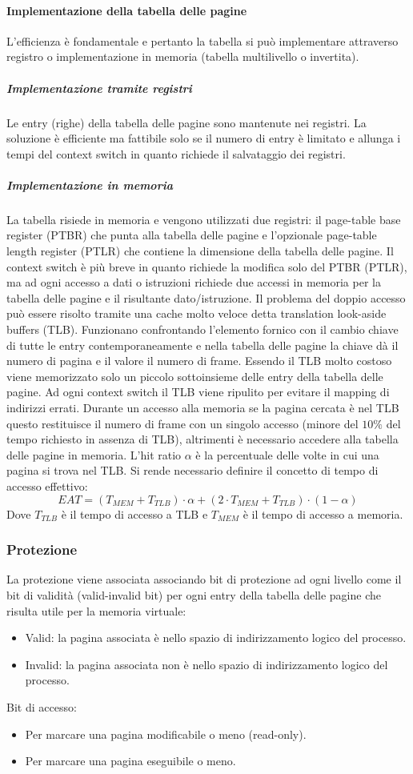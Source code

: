 \paragraph{Implementazione della tabella delle pagine}
L'efficienza \`e fondamentale e pertanto la tabella si pu\`o implementare attraverso registro o implementazione in memoria (tabella multilivello o invertita).
\subparagraph{Implementazione tramite registri}
Le entry (righe) della tabella delle pagine sono mantenute nei registri. La soluzione \`e efficiente ma fattibile solo se il numero di entry \`e limitato e allunga i tempi del context
switch in quanto richiede il salvataggio dei registri. 
\subparagraph{Implementazione in memoria}
La tabella risiede in memoria e vengono utilizzati due registri: il page-table base register (PTBR) che punta alla tabella delle pagine e l'opzionale page-table length register (PTLR) 
che contiene la dimensione della tabella delle pagine. Il context switch \`e pi\`u breve in quanto richiede la modifica solo del PTBR (PTLR), ma ad ogni accesso a dati o istruzioni 
richiede due accessi in memoria per la tabella delle pagine e il risultante dato/istruzione. Il problema del doppio accesso pu\`o essere risolto tramite una cache molto veloce
detta translation look-aside buffers (TLB). Funzionano confrontando l'elemento fornico con il cambio chiave di tutte le entry contemporaneamente e nella tabella delle pagine la
chiave d\`a il numero di pagina e il valore il numero di frame. Essendo il TLB molto costoso viene memorizzato solo un piccolo sottoinsieme delle entry della tabella delle pagine. Ad
ogni context switch il TLB viene ripulito per evitare il mapping di indirizzi errati. Durante un accesso alla memoria se la pagina cercata \`e nel TLB questo restituisce il numero di 
frame con un singolo accesso (minore del $10\%$ del tempo richiesto in assenza di TLB), altrimenti \`e necessario accedere alla tabella delle pagine in memoria. L'hit ratio $\alpha$ \`e
la percentuale delle volte in cui una pagina si trova nel TLB. Si rende necessario definire il concetto di tempo di accesso effettivo: 
$$EAT = (T_{MEM} + T_{TLB})\cdot\alpha + (2\cdot T_{MEM} + T_{TLB})\cdot (1-\alpha)$$
Dove $T_{TLB}$ \`e il tempo di accesso a TLB e $T_{MEM}$ \`e il tempo di accesso a memoria.
\subsubsection{Protezione}
La protezione viene associata associando bit di protezione ad ogni livello come il bit di validit\`a (valid-invalid bit) per ogni entry della tabella delle pagine che risulta utile per
la memoria virtuale:
\begin{itemize}
	\item Valid: la pagina associata \`e nello spazio di indirizzamento logico del processo.
	\item Invalid: la pagina associata non \`e nello spazio di indirizzamento logico del processo.
\end{itemize}
Bit di accesso:
\begin{itemize}
	\item Per marcare una pagina modificabile o meno (read-only).
	\item Per marcare una pagina eseguibile o meno. 
\end{itemize}
